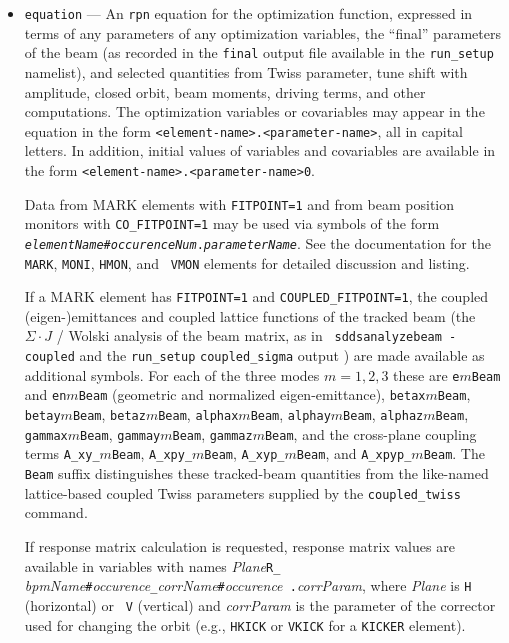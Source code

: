 \documentclass[11pt]{article}
\begin{document}
\begin{itemize}
\item \verb|equation| --- An {\tt rpn} equation for the optimization
function, expressed in terms of any parameters of any optimization
variables, the ``final'' parameters of the beam (as recorded in the
\verb|final| output file available in the \verb|run_setup| namelist),
and selected quantities from Twiss parameter, tune shift with amplitude,
closed orbit, beam moments, driving terms, and other computations.
The optimization variables or covariables may appear in the equation
in the form \verb|<element-name>.<parameter-name>|, all in capital
letters.  In addition, initial values of variables and covariables
are available in the form \verb|<element-name>.<parameter-name>0|.

Data from MARK elements with {\tt FITPOINT=1} and from beam position
monitors with {\tt CO\_FITPOINT=1} may be used via symbols of the form
{\tt {\em elementName}\#{\em occurenceNum}.{\em parameterName}}.  See the
documentation for the {\tt MARK}, {\tt MONI}, {\tt HMON}, and {\tt
VMON} elements for detailed discussion and listing.

If a MARK element has {\tt FITPOINT=1} and {\tt COUPLED\_FITPOINT=1}, the
coupled (eigen-)emittances and coupled lattice functions of the tracked beam
(the $\Sigma\cdot J$ / Wolski analysis of the beam matrix, as in {\tt
sddsanalyzebeam -coupled} and the {\tt run\_setup} {\tt coupled\_sigma}
output \cite{Wolski-PRSTAB9-024001}) are made available as additional
symbols.  For each of the three modes $m=1,2,3$ these are
\verb|e|$m$\verb|Beam| and \verb|en|$m$\verb|Beam| (geometric and normalized
eigen-emittance), \verb|betax|$m$\verb|Beam|, \verb|betay|$m$\verb|Beam|,
\verb|betaz|$m$\verb|Beam|, \verb|alphax|$m$\verb|Beam|,
\verb|alphay|$m$\verb|Beam|, \verb|alphaz|$m$\verb|Beam|,
\verb|gammax|$m$\verb|Beam|, \verb|gammay|$m$\verb|Beam|,
\verb|gammaz|$m$\verb|Beam|, and the cross-plane coupling terms
\verb|A_xy_|$m$\verb|Beam|, \verb|A_xpy_|$m$\verb|Beam|,
\verb|A_xyp_|$m$\verb|Beam|, and \verb|A_xpyp_|$m$\verb|Beam|.  The \verb|Beam|
suffix distinguishes these tracked-beam quantities from the like-named
lattice-based coupled Twiss parameters supplied by the \verb|coupled_twiss|
command.

If response matrix calculation is requested, response matrix values
are available in variables with names {\em Plane}{\tt R\_}{\em
bpmName}\verb|#|{\em occurence}{\tt \_}{\em corrName}\verb|#|{\em occurence}{\tt
.}{\em corrParam}, where {\em Plane} is {\tt H} (horizontal) or {\tt
V} (vertical) and {\em corrParam} is the parameter of the corrector
used for changing the orbit (e.g., {\tt HKICK} or {\tt VKICK} for a
{\tt KICKER} element).


\end{itemize}
\end{document}
